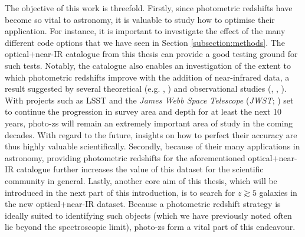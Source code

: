 The objective of this work is threefold. Firstly, since photometric redshifts have become so vital to astronomy, it is valuable to study how to optimise their application. For instance, it is important to investigate the effect of the many different code options that we have seen in Section \ref{subsection:methods}.  The optical+near-IR catalogue from this thesis can provide a good testing ground for such tests. Notably, the catalogue also enables an investigation of the extent to which photometric redshifts improve with the addition of near-infrared data, a result suggested by several theoretical (e.g. \citealt{2008MNRAS.386.1219B}, \citealt{2008MNRAS.387..969A}) and observational studies (\citealt{2009ApJ...690.1236I}, \citealt{2013MNRAS.428.1281J}, \citealt{2015MNRAS.446.2523B}). With projects such as LSST and the \textit{James Webb Space Telescope} (\textit{JWST}; \citealt{2006SSRv..123..485G}) set to continue the progression in survey area and depth for at least the next 10 years, photo-zs will remain an extremely important area of study in the coming decades.  With regard to the future, insights on how to perfect their accuracy are thus highly valuable scientifically. Secondly, because of their many applications in astronomy, providing photometric redshifts for the aforementioned optical+near-IR catalogue further increases the value of this dataset for the scientific community in general. Lastly, another core aim of this thesis, which will be introduced in the next part of this introduction, is to search for $z\gtrsim5$ galaxies in the new optical+near-IR dataset. Because a photometric redshift strategy is ideally suited to identifying such objects (which we have previously noted often lie beyond the spectroscopic limit), photo-zs form a vital part of this endeavour.  \par





